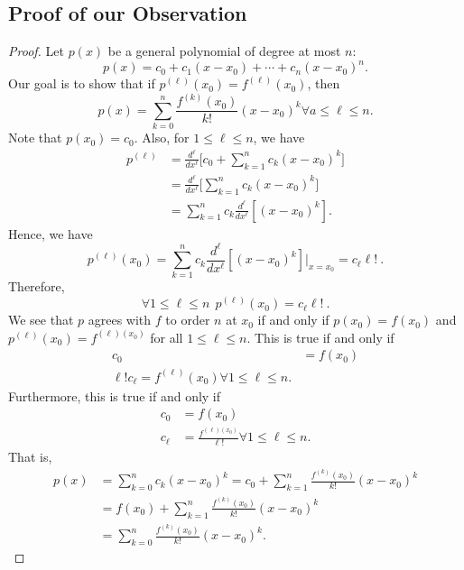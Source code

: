 \subsection{Proof of our Observation}

\begin{proof}
Let \( p(x) \) be a general polynomial of degree at most \( n \):
\[  p(x) = {c}_{0} + {c}_{1} (x - {x}_{0}) + \cdots + {c}_{n} (x - {x}_{0})^{n}. \]
Our goal is to show that if \( p^{(\ell)}({x}_{0}) = f^{(\ell)}({x}_{0}) \), then
\[  p(x) = \sum_{ k= 0  }^{ n } \frac{ f^{(k)}({x}_{0}) }{  k!  }  (x - {x}_{0} )^{k} \forall a \leq  \ell \leq n.  \]
Note that \( p({x}_{0}) = {c}_{0} \). Also, for \( 1 \leq \ell \leq n  \), we have
\begin{align*}
    p^{(\ell)} &= \frac{ d^{\ell} }{ d x^{\ell} }  \Big[ {c}_{0} + \sum_{ k=1  }^{ n } {c}_{k } (x - {x}_{0})^{k } \Big] \\
               &= \frac{ d^{\ell} }{ d x^{\ell} }  \Big[ \sum_{ k=1  }^{ n } {c}_{k } (x - {x}_{0})^{k} \Big] \\
               &= \sum_{ k=1  }^{ n } {c}_{k} \frac{ d^{\ell} }{ d x^{\ell} }  [(x - {x}_{0})^{k }].
\end{align*}
Hence, we have 
\[  p^{(\ell)}({x}_{0}) = \sum_{ k=1  }^{ n } {c}_{k } \frac{ d^{\ell} }{ d x^{\ell} }  [(x - {x}_{0})^{k}] \Big|_{x = {x}_{0}} = {c}_{\ell} \ell!  \ .  \]
Therefore, 
\[  \forall 1 \leq \ell \leq n \ \ p^{(\ell)} ({x}_{0}) = {c}_{\ell} \ell!  \ .\]
We see that \( p \) agrees with \( f  \) to order \( n \) at \( {x}_{0} \) if and only if \( p({x}_{0}) = f({x}_{0}) \) and \( p^{(\ell)}({x}_{0}) = f^{(\ell) ({x}_{0})}  \) for all \( 1 \leq \ell \leq n  \). This is true if and only if
\begin{align*}
    {c}_{0} &= f({x}_{0}) \\
    \ell ! {c}_{\ell} = f^{(\ell)}({x}_{0}) \forall 1 \leq \ell \leq n. 
\end{align*}
Furthermore, this is true if and only if   
\begin{align*}
    {c}_{0} &= f({x}_{0}) \\
    {c}_{\ell} &= \frac{ f^{(\ell)({x}_{0})}  }{ \ell!  } \forall 1 \leq \ell \leq n. 
\end{align*}
That is,
\begin{align*}
    p(x) &= \sum_{ k=0  }^{ n } {c}_{k } (x - {x}_{0})^{k } = {c}_{0} + \sum_{ k=1  }^{ n } \frac{ f^{(k)}({x}_{0}) }{ k!  } (x - {x}_{0})^{k} \\
         &= f({x}_{0}) + \sum_{ k=1  }^{ n } \frac{ f^{(k)}({x}_{0}) }{ k!  } (x - {x}_{0})^{k} \\
         &= \sum_{ k= 0  }^{  n  } \frac{ f^{(k)}({x}_{0} ) }{ k!  } (x - {x}_{0})^{k}.
\end{align*}
\end{proof}

